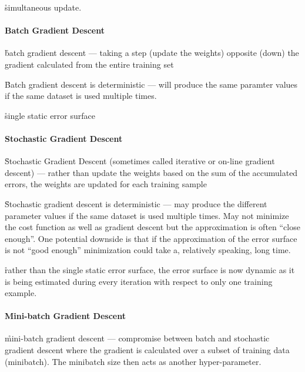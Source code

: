 \r{simultaneous update.}




\paragraph{Batch Gradient Descent}

\r{batch gradient descent --- taking a step (update the weights) opposite (down) the gradient calculated from the entire training set}

\r{Batch gradient descent is deterministic --- will produce the same paramter values if the same dataset is used multiple times.}

\r{single static error surface}


\paragraph{Stochastic Gradient Descent}

\r{Stochastic Gradient Descent (sometimes called iterative or on-line gradient descent) --- rather than update the weights based on the sum of the accumulated errors, the weights are updated for each training sample}

\r{Stochastic gradient descent is deterministic --- may produce the different parameter values if the same dataset is used multiple times. May not minimize the cost function as well as gradient descent but the approximation is often ``close enough''. One potential downside is that if the approximation of the error surface is not ``good enough'' minimization could take a, relatively speaking, long time.}

\r{rather than the single static error surface, the error surface is now dynamic as it is being estimated during every iteration with respect to only one training example.}


\paragraph{Mini-batch Gradient Descent}

\r{mini-batch gradient descent --- compromise between batch and stochastic gradient descent where the gradient is calculated over a subset of training data (minibatch). The minibatch size then acts as another hyper-parameter.}

